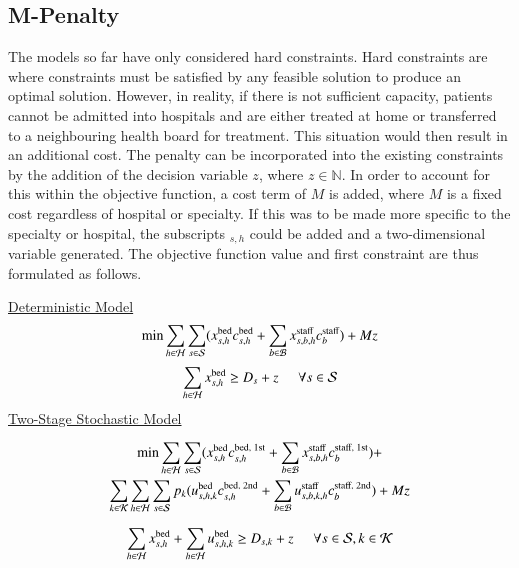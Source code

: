 \documentclass[../thesis.tex]{subfiles}
\begin{document}
\subsection{M-Penalty}\label{sec:scenario2}
The models so far have only considered hard constraints. Hard constraints are where constraints must be satisfied by any feasible solution to produce an optimal solution. However, in reality, if there is not sufficient capacity, patients cannot be admitted into hospitals and are either treated at home or transferred to a neighbouring health board for treatment. This situation would then result in an additional cost. The penalty can be incorporated into the existing constraints by the addition of the decision variable $z$, where $z \in \mathbb{N}$. In order to account for this within the objective function, a cost term of $M$ is added, where $M$ is a fixed cost regardless of hospital or specialty. If this was to be made more specific to the specialty or hospital, the subscripts $_{s,h}$ could be added and a two-dimensional variable generated. The objective function value and first constraint are thus formulated as follows.

\underline{Deterministic Model}
\begin{equation}\label{eq:det_objective}
    \min \sum_{h\in\mathcal{H}}\sum_{s\in\mathcal{S}}(x^\textnormal{bed}_{s,h}c^\textnormal{bed}_{s,h} + \sum_{b\in\mathcal{B}}x^\textnormal{staff}_{s,b,h}c^\textnormal{staff}_{b}) + Mz
\end{equation}
\begin{equation}
    \sum_{h\in\mathcal{H}} x^\textnormal{bed}_{s,h}\geq D_{s} + z \hspace{0.5cm} \forall  s \in \mathcal{S}
\end{equation}
\underline{Two-Stage Stochastic Model}

\begin{multline}\label{eq:sto_objectiveupdate}
    \min \sum_{h\in\mathcal{H}}\sum_{s\in\mathcal{S}}(x^\textnormal{bed}_{s,h}c^\textnormal{bed, 1st}_{s,h} + \sum_{b\in\mathcal{B}}x^\textnormal{staff}_{s,b,h}c^\textnormal{staff, 1st}_{b}) +\\ 
    \sum_{k\in\mathcal{K}}\sum_{h\in\mathcal{H}}\sum_{s\in\mathcal{S}}p_{k}(u^\textnormal{bed}_{s,h,k}c^\textnormal{bed, 2nd}_{s,h} +
   \sum_{b\in\mathcal{B}} u^\textnormal{staff}_{s,b,k,h}c^\textnormal{staff, 2nd}_{b}) + Mz
\end{multline}

\begin{equation}
    \sum_{h\in\mathcal{H}} x^\textnormal{bed}_{s,h} +  \sum_{h\in\mathcal{H}} u^\textnormal{bed}_{s,h,k} \geq D_{s,k} + z \hspace{0.5cm} \forall s \in \mathcal{S}, k \in \mathcal{K}\\
\end{equation}
\end{document}
